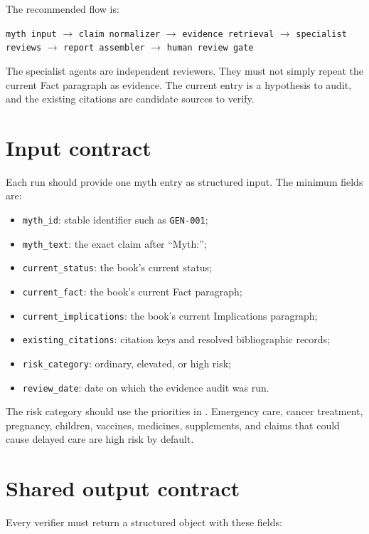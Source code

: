 \documentclass[11pt,oneside]{book}
\begin{document}
The recommended flow is:

\begin{center}
\texttt{myth input} $\rightarrow$ \texttt{claim normalizer} $\rightarrow$ \texttt{evidence retrieval} $\rightarrow$ \texttt{specialist reviews} $\rightarrow$ \texttt{report assembler} $\rightarrow$ \texttt{human review gate}
\end{center}

The specialist agents are independent reviewers. They must not simply repeat the current Fact paragraph as evidence. The current entry is a hypothesis to audit, and the existing citations are candidate sources to verify.

\section{Input contract}

Each run should provide one myth entry as structured input. The minimum fields are:

\begin{itemize}
\item \texttt{myth\_id}: stable identifier such as \texttt{GEN-001};
\item \texttt{myth\_text}: the exact claim after ``Myth:'';
\item \texttt{current\_status}: the book's current status;
\item \texttt{current\_fact}: the book's current Fact paragraph;
\item \texttt{current\_implications}: the book's current Implications paragraph;
\item \texttt{existing\_citations}: citation keys and resolved bibliographic records;
\item \texttt{risk\_category}: ordinary, elevated, or high risk;
\item \texttt{review\_date}: date on which the evidence audit was run.
\end{itemize}

The risk category should use the priorities in . Emergency care, cancer treatment, pregnancy, children, vaccines, medicines, supplements, and claims that could cause delayed care are high risk by default.

\section{Shared output contract}

Every verifier must return a structured object with these fields:
\end{document}
